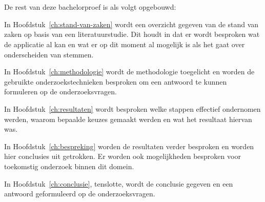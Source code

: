 \section{}%
\label{sec:opzet-bachelorproef}


De rest van deze bachelorproef is als volgt opgebouwd:

In Hoofdstuk~\ref{ch:stand-van-zaken} wordt een overzicht gegeven van de stand van zaken op basis van een literatuurstudie. Dit houdt in dat er wordt besproken wat de applicatie al kan en wat er op dit moment al mogelijk is als het gaat over onderscheiden van stemmen.

In Hoofdstuk~\ref{ch:methodologie} wordt de methodologie toegelicht en worden de gebruikte onderzoekstechnieken besproken om een antwoord te kunnen formuleren op de onderzoeksvragen.

In Hoofdstuk~\ref{ch:resultaten} wordt besproken welke stappen effectief ondernomen werden, waarom bepaalde keuzes gemaakt werden en wat het resultaat hiervan was.

In Hoofdstuk~\ref{ch:bespreking} worden de resultaten verder besproken en worden hier conclusies uit getrokken. Er worden ook mogelijkheden besproken voor toekomstig onderzoek binnen dit domein.

In Hoofdstuk~\ref{ch:conclusie}, tenslotte, wordt de conclusie gegeven en een antwoord geformuleerd op de onderzoeksvragen. 